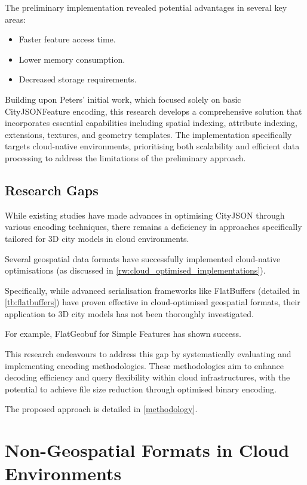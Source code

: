 The preliminary implementation revealed potential advantages in several key areas:

\begin{itemize}
  \item Faster feature access time.
  \item Lower memory consumption.
  \item Decreased storage requirements.
\end{itemize}

Building upon Peters' initial work, which focused solely on basic CityJSONFeature encoding, this research develops a comprehensive solution that incorporates essential capabilities including spatial indexing, attribute indexing, extensions, textures, and geometry templates. The implementation specifically targets cloud-native environments, prioritising both scalability and efficient data processing to address the limitations of the preliminary approach.

\subsection{Research Gaps}
\label{rw:research_gaps}

While existing studies have made advances in optimising CityJSON through various encoding techniques, there remains a deficiency in approaches specifically tailored for 3D city models in cloud environments.

Several geospatial data formats have successfully implemented cloud-native optimisations (as discussed in \autoref{rw:cloud_optimised_implementations}).

Specifically, while advanced serialisation frameworks like FlatBuffers (detailed in \autoref{tb:flatbuffers}) have proven effective in cloud-optimised geospatial formats, their application to 3D city models has not been thoroughly investigated.

For example, FlatGeobuf for Simple Features \citep{flatgeobuf} has shown success.

This research endeavours to address this gap by systematically evaluating and implementing encoding methodologies.
These methodologies aim to enhance decoding efficiency and query flexibility within cloud infrastructures, with the potential to achieve file size reduction through optimised binary encoding.

The proposed approach is detailed in \autoref{methodology}.

\section{Non-Geospatial Formats in Cloud Environments}
\label{rw:non_geospatial_formats}

